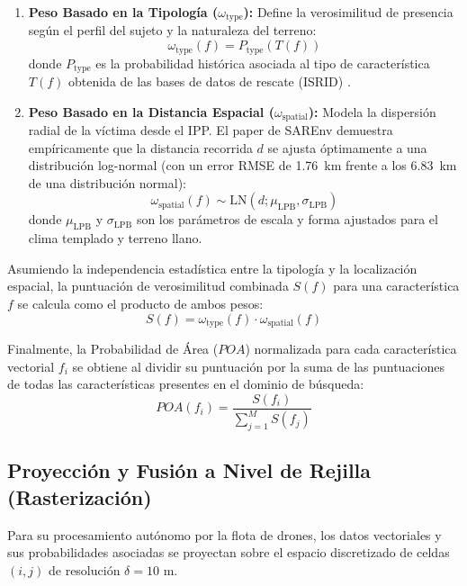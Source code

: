 \begin{enumerate}
    \item \textbf{Peso Basado en la Tipología ($\omega_{\text{type}}$):} Define la verosimilitud de presencia según el perfil del sujeto y la naturaleza del terreno:
    \begin{equation}
        \omega_{\text{type}}(f) = P_{\text{type}}(T(f))
    \end{equation}
    donde $P_{\text{type}}$ es la probabilidad histórica asociada al tipo de característica $T(f)$ obtenida de las bases de datos de rescate (ISRID) \cite{koester2008lost, romero2018manual}.
    \item \textbf{Peso Basado en la Distancia Espacial ($\omega_{\text{spatial}}$):} Modela la dispersión radial de la víctima desde el IPP. El paper de SAREnv demuestra empíricamente que la distancia recorrida $d$ se ajusta óptimamente a una distribución log-normal (con un error RMSE de 1.76~km frente a los 6.83~km de una distribución normal):
    \begin{equation}
        \omega_{\text{spatial}}(f) \sim \text{LN}(d; \mu_{\text{LPB}}, \sigma_{\text{LPB}})
    \end{equation}
    donde $\mu_{\text{LPB}}$ y $\sigma_{\text{LPB}}$ son los parámetros de escala y forma ajustados para el clima templado y terreno llano.
\end{enumerate}

Asumiendo la independencia estadística entre la tipología y la localización espacial, la puntuación de verosimilitud combinada $S(f)$ para una característica $f$ se calcula como el producto de ambos pesos:
\begin{equation}
    S(f) = \omega_{\text{type}}(f) \cdot \omega_{\text{spatial}}(f)
\end{equation}

Finalmente, la Probabilidad de Área ($POA$) normalizada para cada característica vectorial $f_i$ se obtiene al dividir su puntuación por la suma de las puntuaciones de todas las características presentes en el dominio de búsqueda:
\begin{equation}
    POA(f_i) = \frac{S(f_i)}{\sum_{j=1}^{M} S(f_j)}
\end{equation}

\subsection{Proyección y Fusión a Nivel de Rejilla (Rasterización)}

Para su procesamiento autónomo por la flota de drones, los datos vectoriales y sus probabilidades asociadas se proyectan sobre el espacio discretizado de celdas $(i, j)$ de resolución $\delta = 10\text{ m}$.

